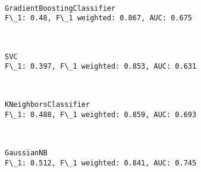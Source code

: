 \documentclass[11pt]{article}
\begin{document}
    \begin{center}
    \end{center}
    { \hspace*{\fill} \\}
    
    \begin{Verbatim}[commandchars=\\\{\}]
GradientBoostingClassifier
F\_1: 0.48, F\_1 weighted: 0.867, AUC: 0.675
    \end{Verbatim}

    \begin{center}
    \end{center}
    { \hspace*{\fill} \\}
    
    \begin{Verbatim}[commandchars=\\\{\}]
SVC
F\_1: 0.397, F\_1 weighted: 0.853, AUC: 0.631
    \end{Verbatim}

    \begin{center}
    \end{center}
    { \hspace*{\fill} \\}
    
    \begin{Verbatim}[commandchars=\\\{\}]
KNeighborsClassifier
F\_1: 0.488, F\_1 weighted: 0.859, AUC: 0.693
    \end{Verbatim}

    \begin{center}
    \end{center}
    { \hspace*{\fill} \\}
    
    \begin{Verbatim}[commandchars=\\\{\}]
GaussianNB
F\_1: 0.512, F\_1 weighted: 0.841, AUC: 0.745
    \end{Verbatim}

    \begin{center}
    \end{center}
    { \hspace*{\fill} \\}
    
\end{document}
